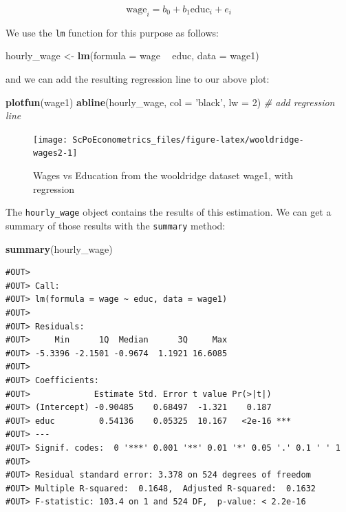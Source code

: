 \documentclass[]{book}
\newenvironment{Shaded}{\begin{snugshade}}{\end{snugshade}}
\newcommand{\KeywordTok}[1]{\textcolor[rgb]{0.13,0.29,0.53}{\textbf{#1}}}
\newcommand{\DataTypeTok}[1]{\textcolor[rgb]{0.13,0.29,0.53}{#1}}
\newcommand{\DecValTok}[1]{\textcolor[rgb]{0.00,0.00,0.81}{#1}}
\newcommand{\StringTok}[1]{\textcolor[rgb]{0.31,0.60,0.02}{#1}}
\newcommand{\CommentTok}[1]{\textcolor[rgb]{0.56,0.35,0.01}{\textit{#1}}}
\newcommand{\OperatorTok}[1]{\textcolor[rgb]{0.81,0.36,0.00}{\textbf{#1}}}
\newcommand{\NormalTok}[1]{#1}
\begin{document}
\begin{equation}
\text{wage}_i = b_0 + b_1 \text{educ}_i + e_i \label{eq:wage}
\end{equation}

We use the \texttt{lm} function for this purpose as follows:

\begin{Shaded}
\begin{Highlighting}[]
\NormalTok{hourly_wage <-}\StringTok{ }\KeywordTok{lm}\NormalTok{(}\DataTypeTok{formula =}\NormalTok{ wage }\OperatorTok{~}\StringTok{ }\NormalTok{educ, }\DataTypeTok{data =}\NormalTok{ wage1)}
\end{Highlighting}
\end{Shaded}

and we can add the resulting regression line to our above plot:

\begin{Shaded}
\begin{Highlighting}[]
\KeywordTok{plotfun}\NormalTok{(wage1)}
\KeywordTok{abline}\NormalTok{(hourly_wage, }\DataTypeTok{col =} \StringTok{'black'}\NormalTok{, }\DataTypeTok{lw =} \DecValTok{2}\NormalTok{) }\CommentTok{# add regression line}
\end{Highlighting}
\end{Shaded}

\begin{figure}

{\centering \texttt{[image: ScPoEconometrics\_files/figure-latex/wooldridge-wages2-1]} 

}

\caption{Wages vs Education from the wooldridge dataset wage1, with regression}\label{fig:wooldridge-wages2}
\end{figure}

The \texttt{hourly\_wage} object contains the results of this
estimation. We can get a summary of those results with the
\texttt{summary} method:

\begin{Shaded}
\begin{Highlighting}[]
\KeywordTok{summary}\NormalTok{(hourly_wage)}
\end{Highlighting}
\end{Shaded}

\begin{verbatim}
#OUT> 
#OUT> Call:
#OUT> lm(formula = wage ~ educ, data = wage1)
#OUT> 
#OUT> Residuals:
#OUT>     Min      1Q  Median      3Q     Max 
#OUT> -5.3396 -2.1501 -0.9674  1.1921 16.6085 
#OUT> 
#OUT> Coefficients:
#OUT>             Estimate Std. Error t value Pr(>|t|)    
#OUT> (Intercept) -0.90485    0.68497  -1.321    0.187    
#OUT> educ         0.54136    0.05325  10.167   <2e-16 ***
#OUT> ---
#OUT> Signif. codes:  0 '***' 0.001 '**' 0.01 '*' 0.05 '.' 0.1 ' ' 1
#OUT> 
#OUT> Residual standard error: 3.378 on 524 degrees of freedom
#OUT> Multiple R-squared:  0.1648,  Adjusted R-squared:  0.1632 
#OUT> F-statistic: 103.4 on 1 and 524 DF,  p-value: < 2.2e-16
\end{verbatim}
\end{document}
